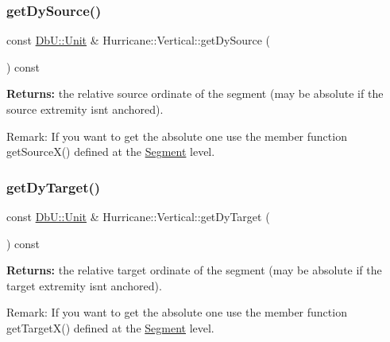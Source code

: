 \subsubsection{\texorpdfstring{get\+Dy\+Source()}{getDySource()}}
{\footnotesize\ttfamily const \mbox{\hyperlink{group__DbUGroup_ga4fbfa3e8c89347af76c9628ea06c4146}{Db\+U\+::\+Unit}} \& Hurricane\+::\+Vertical\+::get\+Dy\+Source (\begin{DoxyParamCaption}{ }\end{DoxyParamCaption}) const\hspace{0.3cm}{\ttfamily [inline]}}

{\bfseries Returns\+:} the relative source ordinate of the segment (may be absolute if the source extremity isn\textquotesingle{}t anchored).

\begin{DoxyParagraph}{Remark\+: If you want to get the absolute one use the member function }
get\+Source\+X() defined at the \mbox{\hyperlink{classHurricane_1_1Segment}{Segment}} level. 
\end{DoxyParagraph}
\mbox{\label{classHurricane_1_1Vertical_af9ae34d224436db7c4c30f18fbd8f9a3}} 
\subsubsection{\texorpdfstring{get\+Dy\+Target()}{getDyTarget()}}
{\footnotesize\ttfamily const \mbox{\hyperlink{group__DbUGroup_ga4fbfa3e8c89347af76c9628ea06c4146}{Db\+U\+::\+Unit}} \& Hurricane\+::\+Vertical\+::get\+Dy\+Target (\begin{DoxyParamCaption}{ }\end{DoxyParamCaption}) const\hspace{0.3cm}{\ttfamily [inline]}}

{\bfseries Returns\+:} the relative target ordinate of the segment (may be absolute if the target extremity isn\textquotesingle{}t anchored).

\begin{DoxyParagraph}{Remark\+: If you want to get the absolute one use the member function }
get\+Target\+X() defined at the \mbox{\hyperlink{classHurricane_1_1Segment}{Segment}} level. 
\end{DoxyParagraph}
\mbox{\label{classHurricane_1_1Vertical_aaea60cb8247f4ea837f90a4532901143}} 
